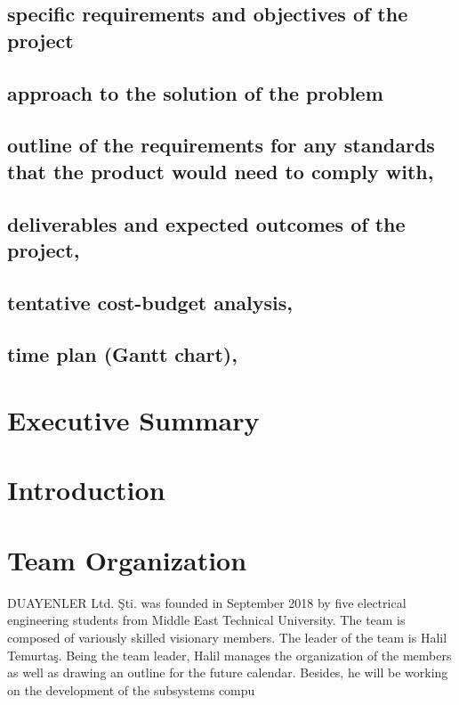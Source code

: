 \documentclass[a4paper,12pt]{article}
\begin{document}
\subsection{specific requirements and objectives of the project}


\subsection{approach to the solution of the problem}


\subsection{outline of the requirements for any standards that the product would need to comply with,}


\subsection{deliverables and expected outcomes of the project,}


\subsection{tentative cost-budget analysis,}

\subsection{time plan (Gantt chart),}



\section{Executive Summary}


\section{Introduction}


\section{Team Organization}
DUAYENLER Ltd. Şti. was founded in September 2018 by five electrical engineering students from Middle East Technical University. The team is composed of variously skilled visionary members. The leader of the team is Halil Temurtaş. Being the team leader, Halil manages the organization of the members as well as drawing an outline for the future calendar. Besides, he will be working on the development of the subsystems compu
\end{document}
